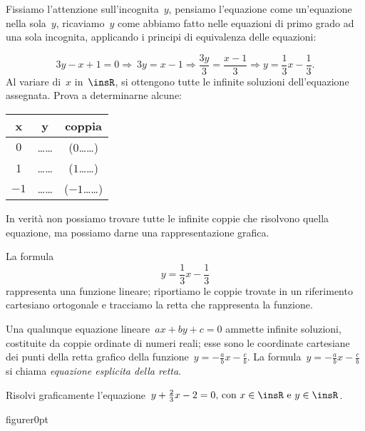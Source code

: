 Fissiamo l'attenzione sull'incognita~\(y\),
pensiamo l'equazione come un'equazione
nella sola~\(y\), ricaviamo~\(y\) come abbiamo fatto nelle equazioni di primo
grado ad una sola incognita, applicando i principi di equivalenza delle
equazioni:

\begin{equation*}
3y-x+1=0\Rightarrow~3y=x-1\Rightarrow\frac{3y}{3}=\frac{x-1}{3}\Rightarrow 
y=\frac{1}{3}x-\frac{1}{3}.
\end{equation*}
Al variare di~\(x\) in~\(\insR\), si ottengono tutte le infinite
soluzioni dell'equazione assegnata.
Prova a determinarne alcune:
\begin{center}
 \begin{tabular}{ccc}
\toprule
x & y & coppia\\
\midrule
\(0\) &\ldots\ldots & (\(0\)\ldots\ldots)\\
1& \ldots\ldots &(\(1\)\ldots\ldots)\\
\(-1\) & \ldots\ldots & (\(-1\)\ldots\ldots)\\
\bottomrule
\end{tabular}
\end{center}

In verità non possiamo trovare tutte le infinite coppie che risolvono
quella equazione, ma possiamo darne una rappresentazione grafica.

\begin{wrapfigure}{o}{0pt}
 
\end{wrapfigure}

La formula \[y=\frac{1}{3}x-\frac{1}{3}\] rappresenta una funzione
lineare; riportiamo le coppie trovate in un riferimento cartesiano
ortogonale e tracciamo la retta che rappresenta la funzione.

Una qualunque equazione lineare~\(ax+by+c=0\) ammette infinite
soluzioni, costituite da coppie ordinate di numeri reali; esse sono le
coordinate cartesiane dei punti della retta grafico della 
funzione~\(y=-{\frac{a}{b}}x-\frac{c}{b}\).
La formula~\(y=-{\frac{a}{b}}x-\frac{c}{b}\) si chiama \emph{equazione esplicita 
della retta}.

\begin{esempio}
 Risolvi graficamente l'equazione~\(y+\frac{2}{3}x-2=0\text{, con 
}x\in\insR\text{ e }y\in\insR\).
\end{esempio}

\begin{wrapfloat}{figure}{r}{0pt}

\end{wrapfloat}

